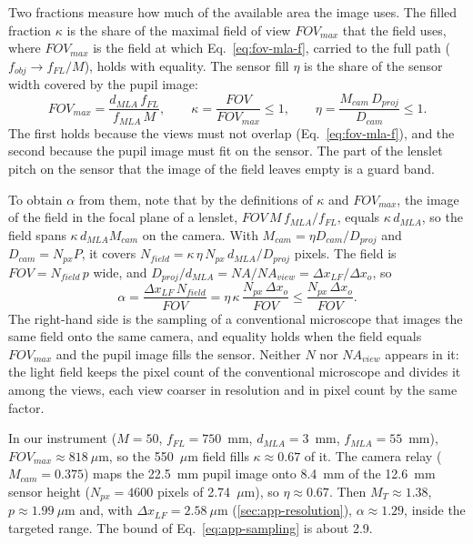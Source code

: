 Two fractions measure how much of the available area the image uses. The filled fraction $\kappa$ is the share of the maximal field of view $FOV_{max}$ that the field uses, where $FOV_{max}$ is the field at which Eq.~\eqref{eq:fov-mla-f}, carried to the full path ($f_{obj}\to f_{FL}/M$), holds with equality. The sensor fill $\eta$ is the share of the sensor width covered by the pupil image:
\begin{equation}
    FOV_{max} = \frac{d_{MLA}\,f_{FL}}{f_{MLA}\,M}, \qquad
    \kappa = \frac{FOV}{FOV_{max}} \le 1, \qquad
    \eta = \frac{M_{cam}\,D_{proj}}{D_{cam}} \le 1.
    \label{eq:app-fractions}
\end{equation}
The first holds because the views must not overlap (Eq.~\eqref{eq:fov-mla-f}), and the second because the pupil image must fit on the sensor. The part of the lenslet pitch on the sensor that the image of the field leaves empty is a guard band.

To obtain $\alpha$ from them, note that by the definitions of $\kappa$ and $FOV_{max}$, the image of the field in the focal plane of a lenslet, $FOV\,M\,f_{MLA}/f_{FL}$, equals $\kappa\,d_{MLA}$, so the field spans $\kappa\,d_{MLA}M_{cam}$ on the camera. With $M_{cam}=\eta D_{cam}/D_{proj}$ and $D_{cam}=N_{px}P$, it covers $N_{field}=\kappa\,\eta\,N_{px}\,d_{MLA}/D_{proj}$ pixels. The field is $FOV=N_{field}\,p$ wide, and $D_{proj}/d_{MLA}=NA/NA_{view}=\Delta x_{LF}/\Delta x_o$, so
\begin{equation}
    \alpha = \frac{\Delta x_{LF}\,N_{field}}{FOV}
        = \eta\,\kappa\,\frac{N_{px}\,\Delta x_o}{FOV}
        \le \frac{N_{px}\,\Delta x_o}{FOV}.
    \label{eq:app-sampling}
\end{equation}
The right-hand side is the sampling of a conventional microscope that images the same field onto the same camera, and equality holds when the field equals $FOV_{max}$ and the pupil image fills the sensor. Neither $N$ nor $NA_{view}$ appears in it: the light field keeps the pixel count of the conventional microscope and divides it among the views, each view coarser in resolution and in pixel count by the same factor.

In our instrument ($M=50$, $f_{FL}=750$~mm, $d_{MLA}=3$~mm, $f_{MLA}=55$~mm), $FOV_{max}\approx818~\mu$m, so the 550~$\mu$m field fills $\kappa\approx0.67$ of it. The camera relay ($M_{cam}=0.375$) maps the 22.5~mm pupil image onto 8.4~mm of the 12.6~mm sensor height ($N_{px}=4600$ pixels of 2.74~$\mu$m), so $\eta\approx0.67$. Then $M_T\approx1.38$, $p\approx1.99~\mu$m and, with $\Delta x_{LF}=2.58~\mu$m (\cref{sec:app-resolution}), $\alpha\approx1.29$, inside the targeted range. The bound of Eq.~\eqref{eq:app-sampling} is about 2.9.

